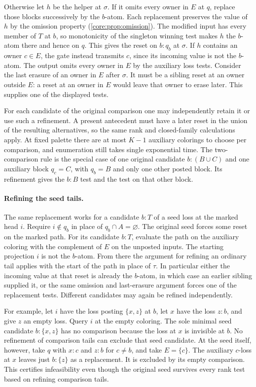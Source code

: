 Otherwise let $h$ be the helper at $\sigma$.
If it omits every owner in $E$ at $q$, replace those
blocks successively by the $b$-atom. Each replacement
preserves the value of $h$ by the omission property
(\cref{core:prop:omission}). The modified input has
every member of $T$ at $b$, so monotonicity of the
singleton winning test makes $h$ the $b$-atom there
and hence on $q$. This gives the reset on $b:q_b$ at
$\sigma$. If $h$ contains an owner $c\in E$, the gate
instead transmits $c$, since its incoming value is
not the $b$-atom. The output omits every owner in
$E$ by the auxiliary loss tests. Consider the last
erasure of an owner in $E$ after $\sigma$. It must
be a sibling reset at an owner outside $E$: a reset
at an owner in $E$ would leave that owner to erase
later. This supplies one of the displayed tests.

For each candidate of the original comparison one
may independently retain it or use such a refinement.
A present antecedent must have a later reset in the
union of the resulting alternatives, so the same rank
and closed-family calculations apply. At fixed palette
there are at most $K-1$ auxiliary colorings to choose
per comparison, and enumeration still takes single
exponential time. The two-comparison rule is the
special case of one original candidate $b:(B\cup C)$
and one auxiliary block $q_c=C$, with $q_b=B$
and only one other posted block. Its refinement
gives the $b:B$ test and the test on that other block.

\paragraph{Refining the seed tails.}
The same replacement works for a candidate $b:T$
of a seed loss at the marked head $i$. Require
$i\notin q_b$ in place of $q_b\cap A=\varnothing$.
The original seed forces some reset on the marked
path. For its candidate $b:T$, evaluate the path on
the auxiliary coloring with the complement of $E$
on the unposted inputs. The starting projection $i$
is not the $b$-atom. From there the argument for
refining an ordinary tail applies with the start of
the path in place of $\tau$. In particular either
the incoming value at that reset is already the
$b$-atom, in which case an earlier sibling supplied
it, or the same omission and last-erasure argument
forces one of the replacement tests. Different
candidates may again be refined independently.

For example, let $i$ have the loss posting $\{x,z\}$
at $b$, let $x$ have the loss $z{:}b$, and give $z$
an empty loss. Query $i$ at the empty coloring.
The sole minimal seed candidate $b:\{x,z\}$ has no
comparison because the loss at $x$ is invisible at
$b$. No refinement of comparison tails can exclude
that seed candidate. At the seed itself, however,
take $q$ with $x{:}c$ and $z{:}b$ for $c\ne b$,
and take $E=\{c\}$. The auxiliary $c$-loss at $x$
leaves just $b:\{z\}$ as a replacement. It is
excluded by its empty comparison. This certifies
infeasibility even though the original seed survives
every rank test based on refining comparison tails.

